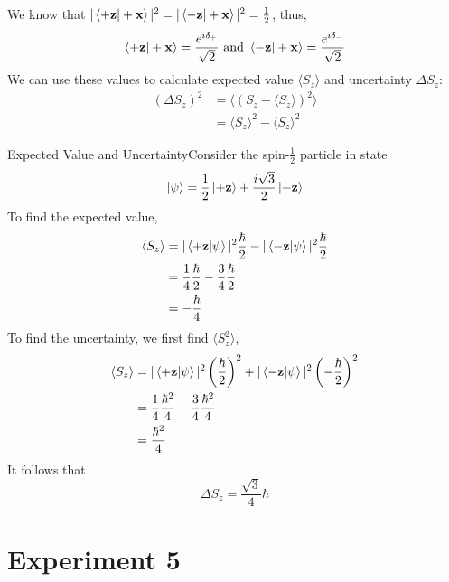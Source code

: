 \documentclass{report}
\newcommand{\ex}[2]{\begin{Example}{#1}{}#2\end{Example}}
\begin{document}
We know that \(|\braket{+ \mathbf z | + \mathbf x}|^2 =|\braket{- \mathbf z | + \mathbf x}|^2 = \frac{1}{2} \), thus, 
\[
	\braket{+ \mathbf z | + \mathbf x} = \frac{e^{i\delta_+}}{\sqrt 2} \text{ and } \braket{- \mathbf z | + \mathbf x} = \frac{e^{i\delta_-}}{\sqrt 2}
\]
We can use these values to calculate expected value \(\langle S_z \rangle\) and uncertainty \(\Delta S_z\):
\begin{align*}
	(\Delta S_z)^2 &= \langle ( S_z - \langle S_z \rangle ) ^2 \rangle\\
		       &=\langle S_z \rangle^2 - \langle S_z \rangle ^2
\end{align*}
\ex{Expected Value and Uncertainty}{Consider the spin-\(\frac{1}{2}\) particle in state
\[
\ket \psi = \frac{1}{2}\ket{+ \mathbf z} + \frac{i \sqrt 3}{2}\ket{- \mathbf z}
\] 
To find the expected value, 
\begin{align*}
\langle S_z \rangle & = |\braket{+ \mathbf z | \psi}|^2 \frac{\hbar}{2} - |\braket{- \mathbf z | \psi}|^2 \frac{\hbar}{2} \\
		    &=\frac{1}{4}\frac{\hbar}{2} - \frac{3}{4}\frac{\hbar}{2} \\
		    &= -\frac{\hbar}{4}
\end{align*}
To find the uncertainty, we first find \(\langle S_z^2 \rangle\),
\begin{align*}
\langle S_z \rangle & = |\braket{+ \mathbf z | \psi}|^2 \left(\frac{\hbar}{2}\right)^2 + |\braket{- \mathbf z | \psi}|^2 \left(-\frac{\hbar}{2}\right)^2 \\
		    &=\frac{1}{4}\frac{\hbar^2}{4} - \frac{3}{4}\frac{\hbar^2}{4} \\
		    &= \frac{\hbar^2}{4}
\end{align*}
It follows that 
\[
\Delta S_z = \frac{\sqrt 3}{4}\hbar
\] 

}
\section{Experiment 5}
\end{document}
